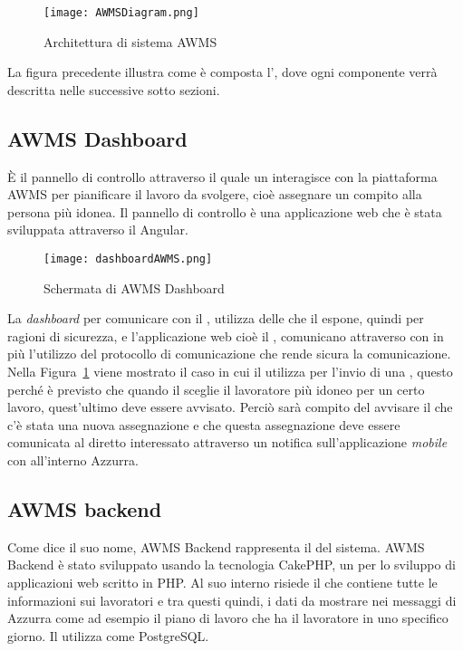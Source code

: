  \begin{figure}[h]
 	\begin{center}
 		\texttt{[image: AWMSDiagram.png]}
 		\caption{Architettura di sistema AWMS}\label{fig:arch}
 	\end{center}
 \end{figure}
La figura precedente illustra come è composta l', dove ogni componente verrà descritta nelle successive sotto sezioni.
\begin{trivlist}
	\item \subsection{AWMS Dashboard}
	È il pannello di controllo attraverso il quale un  interagisce con la piattaforma \gls{AWMS} per pianificare il lavoro da svolgere, cioè assegnare un compito alla persona più idonea. Il pannello di controllo è una applicazione web che è stata sviluppata attraverso il  Angular.
	\begin{figure}[h] 
		\begin{center}
			\texttt{[image: dashboardAWMS.png]}
			\caption{Schermata di AWMS Dashboard}
		\end{center}
	\end{figure}
	 	La \emph{dashboard} per comunicare con il , utilizza delle  che il  espone, quindi per ragioni di sicurezza,  e l'applicazione web cioè il , comunicano attraverso  con in più l'utilizzo del protocollo di comunicazione  che rende sicura la comunicazione. Nella Figura~\ref{fig:arch} viene mostrato il caso in cui il  utilizza  per l'invio di una , questo perché è previsto che quando il  sceglie il lavoratore più idoneo per un certo lavoro, quest'ultimo deve essere avvisato. Perciò sarà compito del  avvisare il  che c'è stata una nuova assegnazione e che questa assegnazione deve essere comunicata al diretto interessato attraverso un notifica sull'applicazione \emph{mobile} con all'interno Azzurra.
	\item \subsection{AWMS backend}
	Come dice il suo nome, AWMS Backend rappresenta il  del sistema. AWMS Backend è stato sviluppato usando la tecnologia CakePHP, un  per lo sviluppo di applicazioni web scritto in \gls{PHP}. Al suo interno risiede il  che contiene tutte le informazioni sui lavoratori e tra questi quindi, i dati da mostrare nei messaggi di Azzurra come ad esempio il piano di lavoro che ha il lavoratore in uno specifico giorno. Il  utilizza come  PostgreSQL. \\
	

\end{trivlist}

